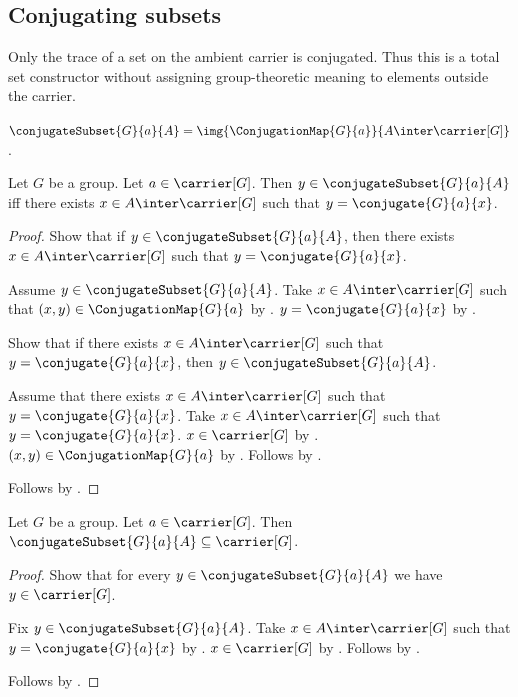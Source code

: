 \subsection{Conjugating subsets}

Only the trace of a set on the ambient carrier is conjugated.  Thus this is a
total set constructor without assigning group-theoretic meaning to elements
outside the carrier.

\begin{definition}\label{conjugate_subset}
    $\conjugateSubset{G}{a}{A}=
        \img{\ConjugationMap{G}{a}}{A\inter\carrier[G]}$.
\end{definition}

\begin{proposition}\label{conjugate_subset_iff}
    Let $G$ be a group.
    Let $a\in\carrier[G]$.
    Then $y\in\conjugateSubset{G}{a}{A}$ iff
        there exists $x\in A\inter\carrier[G]$ such that
            $y=\conjugate{G}{a}{x}$.
\end{proposition}
\begin{proof}
    Show that if $y\in\conjugateSubset{G}{a}{A}$, then
        there exists $x\in A\inter\carrier[G]$ such that
            $y=\conjugate{G}{a}{x}$.
    \begin{subproof}
        Assume $y\in\conjugateSubset{G}{a}{A}$.
        Take $x\in A\inter\carrier[G]$ such that
            $(x,y)\in\ConjugationMap{G}{a}$ by
            .
        $y=\conjugate{G}{a}{x}$ by
            .
    \end{subproof}
    Show that if there exists $x\in A\inter\carrier[G]$ such that
        $y=\conjugate{G}{a}{x}$, then
        $y\in\conjugateSubset{G}{a}{A}$.
    \begin{subproof}
        Assume that there exists $x\in A\inter\carrier[G]$ such that
            $y=\conjugate{G}{a}{x}$.
        Take $x\in A\inter\carrier[G]$ such that
            $y=\conjugate{G}{a}{x}$.
        $x\in\carrier[G]$ by .
        $(x,y)\in\ConjugationMap{G}{a}$ by
            .
        Follows by .
    \end{subproof}
    Follows by \auto.
\end{proof}

\begin{proposition}\label{conjugate_subset_subseteq_carrier}
    Let $G$ be a group.
    Let $a\in\carrier[G]$.
    Then $\conjugateSubset{G}{a}{A}\subseteq\carrier[G]$.
\end{proposition}
\begin{proof}
    Show that for every $y\in\conjugateSubset{G}{a}{A}$ we have
        $y\in\carrier[G]$.
    \begin{subproof}
        Fix $y\in\conjugateSubset{G}{a}{A}$.
        Take $x\in A\inter\carrier[G]$ such that
            $y=\conjugate{G}{a}{x}$ by
            .
        $x\in\carrier[G]$ by .
        Follows by .
    \end{subproof}
    Follows by .
\end{proof}

